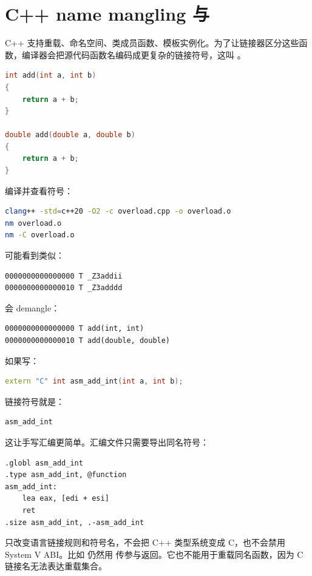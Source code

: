 \section{C++ name mangling 与 }

C++ 支持重载、命名空间、类成员函数、模板实例化。为了让链接器区分这些函数，编译器会把源代码函数名编码成更复杂的链接符号，这叫 。

\begin{lstlisting}[language=C++]
int add(int a, int b)
{
    return a + b;
}

double add(double a, double b)
{
    return a + b;
}
\end{lstlisting}

编译并查看符号：

\begin{lstlisting}[language=bash]
clang++ -std=c++20 -O2 -c overload.cpp -o overload.o
nm overload.o
nm -C overload.o
\end{lstlisting}

可能看到类似：

\begin{lstlisting}
0000000000000000 T _Z3addii
0000000000000010 T _Z3adddd
\end{lstlisting}

 会 demangle：

\begin{lstlisting}
0000000000000000 T add(int, int)
0000000000000010 T add(double, double)
\end{lstlisting}

如果写：

\begin{lstlisting}[language=C++]
extern "C" int asm_add_int(int a, int b);
\end{lstlisting}

链接符号就是：

\begin{lstlisting}
asm_add_int
\end{lstlisting}

这让手写汇编更简单。汇编文件只需要导出同名符号：

\begin{lstlisting}
.globl asm_add_int
.type asm_add_int, @function
asm_add_int:
    lea eax, [edi + esi]
    ret
.size asm_add_int, .-asm_add_int
\end{lstlisting}

\begin{deepdive}
 只改变语言链接规则和符号名，不会把 C++ 类型系统变成 C，也不会禁用 System V ABI。比如  仍然用  传参与返回。它也不能用于重载同名函数，因为 C 链接名无法表达重载集合。
\end{deepdive}

